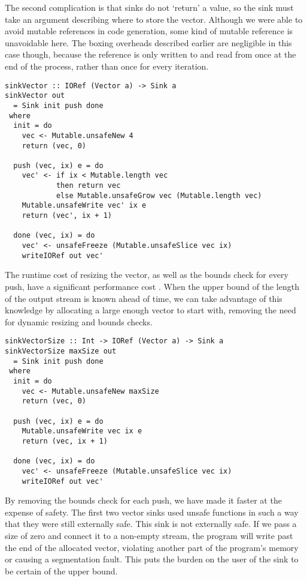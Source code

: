 The second complication is that sinks do not `return' a value, so the sink must take an argument describing where to store the vector.
Although we were able to avoid mutable references in code generation, some kind of mutable reference is unavoidable here.
The boxing overheads described earlier are negligible in this case though, because the reference is only written to and read from once at the end of the process, rather than once for every iteration.

\begin{lstlisting}
sinkVector :: IORef (Vector a) -> Sink a
sinkVector out
  = Sink init push done
 where
  init = do
    vec <- Mutable.unsafeNew 4
    return (vec, 0)

  push (vec, ix) e = do
    vec' <- if ix < Mutable.length vec
            then return vec
            else Mutable.unsafeGrow vec (Mutable.length vec)
    Mutable.unsafeWrite vec' ix e
    return (vec', ix + 1)

  done (vec, ix) = do
    vec' <- unsafeFreeze (Mutable.unsafeSlice vec ix)
    writeIORef out vec'
\end{lstlisting}

The runtime cost of resizing the vector, as well as the bounds check for every push, have a significant performance cost .
When the upper bound of the length of the output stream is known ahead of time, we can take advantage of this knowledge by allocating a large enough vector to start with, removing the need for dynamic resizing and bounds checks.


\begin{lstlisting}
sinkVectorSize :: Int -> IORef (Vector a) -> Sink a
sinkVectorSize maxSize out
  = Sink init push done
 where
  init = do
    vec <- Mutable.unsafeNew maxSize
    return (vec, 0)

  push (vec, ix) e = do
    Mutable.unsafeWrite vec ix e
    return (vec, ix + 1)

  done (vec, ix) = do
    vec' <- unsafeFreeze (Mutable.unsafeSlice vec ix)
    writeIORef out vec'
\end{lstlisting}

By removing the bounds check for each push, we have made it faster at the expense of safety.
The first two vector sinks used unsafe functions in such a way that they were still externally safe.
This sink is not externally safe.
If we pass a size of zero and connect it to a non-empty stream, the program will write past the end of the allocated vector, violating another part of the program's memory or causing a segmentation fault.
This puts the burden on the user of the sink to be certain of the upper bound.

